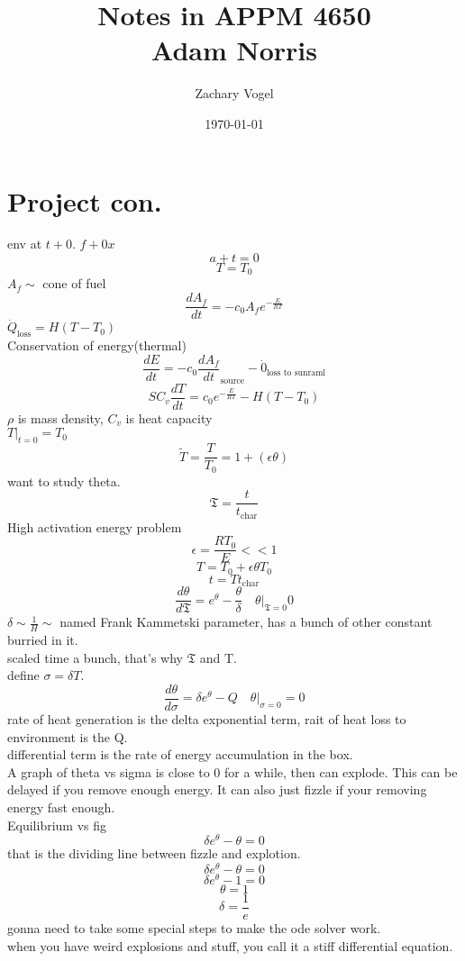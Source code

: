 \documentclass{article}
\begin{document}
\author{Zachary Vogel}
\date{\today}
\title{Notes in APPM 4650\\Adam Norris}

\maketitle



\section{Project con.}
env at $t+0$.
$f+0x$\\
\[a+t=0\]
\[T=T_0\]
$A_f\sim$ cone of fuel\\
\[\frac{dA_f}{dt}=-c_0 A_fe^{-\frac{E}{RT}}\]
$\dot{Q}_{\text{loss}}=H(T-T_0)$\\
Conservation of energy(thermal)\\
\[\frac{dE}{dt}=-c_0 \frac{dA_{f}}{dt}_{\text{source}}-\dot{0}_{\text{loss to sunraml}}\]
\[SC_v\frac{dT}{dt}=c_0 e^{-\frac{E}{RT}}-H(T-T_0)\]
$\rho$ is mass density, $C_v$ is heat capacity\\
$T|_{t=0}=T_0$\\
\[\tilde{T}=\frac{T}{T_0}=1+(\epsilon \theta)\]
want to study theta.\\
\[\mathfrak{T}=\frac{t}{t_{\text{char}}}\]
High activation energy problem\\
\[\epsilon=\frac{RT_0}{E}<<1\]
\[T=T_0+\epsilon \theta T_0\]
\[t=Tt_{\text{char}}\]
\[\frac{d\theta}{d\mathfrak{T}}=e^{\theta}-\frac{\theta}{\delta}\quad \theta|_{\mathfrak{T}=0} 0\]
$\delta\sim \frac{1}{H}\sim$ named Frank Kammetski parameter, has a bunch of other constant burried in it.\\
scaled time a bunch, that's why $\mathfrak{T}$ and T.\\
define $\sigma=\delta T$.\\
\[\frac{d\theta}{d\sigma}=\delta e^\theta -Q\quad \theta|_{\sigma=0}=0\]
rate of heat generation is the delta exponential term, rait of heat loss to environment is the Q.\\
differential term is the rate of energy accumulation in the box.\\
A graph of theta vs sigma is close to 0 for a while, then can explode. This can be delayed if you remove enough energy. It can also just fizzle if your removing energy fast enough.\\
Equilibrium vs fig\\
\[\delta e^\theta -\theta=0\]
that is the dividing line between fizzle and explotion.\\
\[\delta e^{\theta}-\theta=0\]
\[\delta e^{\theta}-1=0\]
\[\theta=1\]
\[\delta=\frac{1}{e}\]
gonna need to take some special steps to make the ode solver work.\\
when you have weird explosions and stuff, you call it a stiff differential equation.\\
\end{document}
